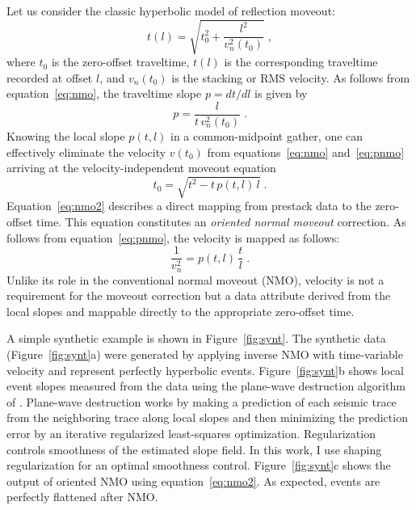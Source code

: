 
Let us consider the classic hyperbolic model of reflection moveout:
\begin{equation}
  \label{eq:nmo}
  t(l) = \sqrt{t_0^2 + \frac{l^2}{v_n^2(t_0)}}\;,
\end{equation}
where $t_0$ is the zero-offset traveltime, $t(l)$ is the corresponding
traveltime recorded at offset $l$, and $v_n(t_0)$ is the stacking or
RMS velocity. As follows from equation~\ref{eq:nmo}, the traveltime slope $p= d t/d l$ is given by 
\begin{equation}
  \label{eq:pnmo}
  p = \frac{l}{t\,v_n^2(t_0)}\;.
\end{equation}
Knowing the local slope $p(t,l)$ in a common-midpoint gather, one can
effectively eliminate the velocity $v(t_0)$ from
equations~\ref{eq:nmo} and~\ref{eq:pnmo} arriving at the
velocity-independent moveout equation \cite[]{Ottolini.sep.37.59}
\begin{equation}
  \label{eq:nmo2}
  t_0 = \sqrt{t^2 - t\,p(t,l)\,l}\;.
\end{equation}
Equation~\ref{eq:nmo2} describes a direct mapping from prestack data
to the zero-offset time. This equation constitutes an \emph{oriented
normal moveout} correction. As follows from equation~\ref{eq:pnmo},
the velocity is mapped as follows:
\begin{equation}
  \label{eq:vnmo}
  \frac{1}{v_n^2} = p(t,l)\,\frac{t}{l}\;. 
\end{equation}
Unlike its role in the conventional normal moveout (NMO), velocity is
not a requirement for the moveout correction but 
 a data attribute derived from the local slopes and mappable
directly to the appropriate zero-offset time.

A simple synthetic example is shown in Figure~\ref{fig:synt}. The
synthetic data (Figure~\ref{fig:synt}a) were generated by applying
inverse NMO with time-variable velocity and represent perfectly
hyperbolic events. Figure~\ref{fig:synt}b shows local event slopes
measured from the data using the plane-wave destruction algorithm of
\cite{GEO67-06-19461960}. Plane-wave destruction
\cite[]{Claerbout.blackwell.92} works by making a prediction of each
seismic trace from the neighboring trace along local slopes and then
minimizing the prediction error by an iterative regularized
least-squares optimization. Regularization controls smoothness of the
estimated slope field. In this work, I use shaping regularization
\cite[]{shape} for an optimal smoothness control.
Figure~\ref{fig:synt}c shows the output of oriented NMO using
equation~\ref{eq:nmo2}. As expected,   events are
perfectly flattened after NMO.

